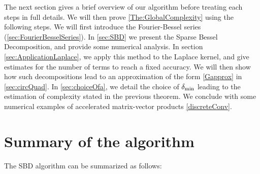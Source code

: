 \documentclass[11pt,a4paper]{article}
\begin{document}
The next section gives a brief overview of our algorithm before treating each steps in full details. We will then prove \autoref{The:GlobalComplexity} using the following steps. We will first introduce the Fourier-Bessel series (\autoref{sec:FourierBesselSeries}). In \autoref{sec:SBD} we present the Sparse Bessel Decomposition, and provide some numerical analysis. In section \autoref{sec:ApplicationLaplace}, we apply this method to the Laplace kernel, and give estimates for the number of terms to reach a fixed accuracy. We will then show how such decompositions lead to an approximation of the form \eqref{Gapprox} in \autoref{sec:circQuad}. In \autoref{sec:choiceOfa}, we detail the choice of $\delta_{\min}$ leading to the estimation of complexity stated in the previous theorem. We conclude with some numerical examples of accelerated matrix-vector products \eqref{discreteConv}. 




\section{Summary of the algorithm}
\label{sec:overview}

The SBD algorithm can be summarized as follows:
\end{document}
